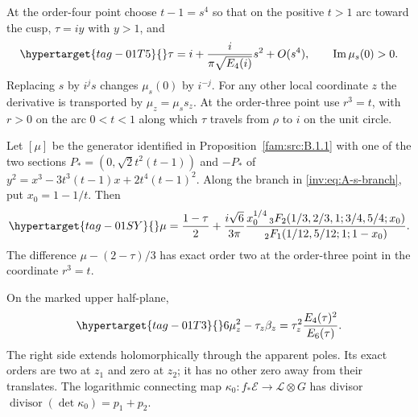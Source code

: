 
\begin{definition}
\hypertarget{tag-PI07}{}\label{I:def:finite-coordinates}
At the order-four point choose $t-1=s^4$ so that on the positive
$t>1$ arc toward the cusp, $\tau=iy$ with $y>1$, and
\begin{equation}\hypertarget{tag-01T5}{}\label{inv:eq:A-s-branch}
\tau=i+\frac{i}{\pi\sqrt{E_4(i)}}s^2+O(s^4),\qquad
\operatorname{Im}\mu_s(0)>0.
\end{equation}
Replacing $s$ by $i^js$ changes $\mu_s(0)$ by $i^{-j}$.
For any other local coordinate $z$ the derivative is transported
by $\mu_z=\mu_s s_z$. At the order-three point use $r^3=t$,
with $r>0$ on the arc $0<t<1$ along which $\tau$ travels from
$\rho$ to $i$ on the unit circle.
\end{definition}

\begin{proposition}
\hypertarget{tag-01RW}{}\label{inv:A2.3}
Let $[\mu]$ be the generator identified in
Proposition~\ref{fam:src:B.1.1} with
one of the two sections
$P_*=(0,\sqrt2t^2(t-1))$ and $-P_*$ of
$y^2=x^3-3t^3(t-1)x+2t^4(t-1)^2$.
Along the branch in \eqref{inv:eq:A-s-branch}, put $x_0=1-1/t$.
Then
\begin{equation}\hypertarget{tag-01SY}{}\label{inv:eq:A-DI-branch}
\mu=\frac{1-\tau}{2}
 +\frac{i\sqrt6}{3\pi}
 \frac{x_0^{1/4}\,{}_3F_2(1/3,2/3,1;3/4,5/4;x_0)}
 {{}_2F_1(1/12,5/12;1;1-x_0)}.
\end{equation}
The difference $\mu-(2-\tau)/3$ has exact order two at the
order-three point in the coordinate $r^3=t$.
\end{proposition}

\begin{proposition}\hypertarget{tag-01RU}{}\label{inv:A2.1}\label{wb:prop:log-ks-divisor}\label{wb:prop:period-derivative-determinant}

On the marked upper half-plane,
\begin{equation}\hypertarget{tag-01T3}{}\label{inv:eq:A-modular-K}
6\mu_z^2-\tau_z\beta_z
=\tau_z^2\frac{E_4(\tau)^2}{E_6(\tau)}.
\end{equation}
The right side extends holomorphically through the apparent poles.
Its exact orders are two at $z_1$ and zero at $z_2$; it has no other
zero away from their translates.  The logarithmic connecting map
$\kappa_0:f_*\mathcal E\to\mathcal L\otimes G$ has divisor
$\operatorname{divisor}(\det\kappa_0)=p_1+p_2$.
\end{proposition}


